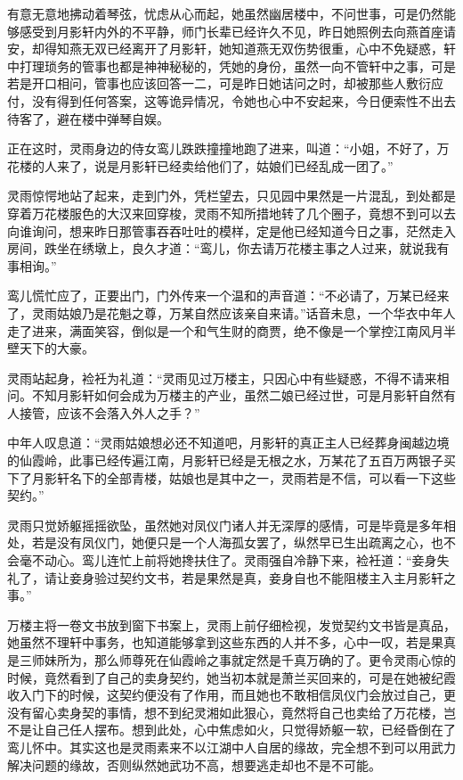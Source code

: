 有意无意地拂动着琴弦，忧虑从心而起，她虽然幽居楼中，不问世事，可是仍然能够感受到月影轩内外的不平静，师门长辈已经许久不见，昨日她照例去向燕首座请安，却得知燕无双已经离开了月影轩，她知道燕无双伤势很重，心中不免疑惑，轩中打理琐务的管事也都是神神秘秘的，凭她的身份，虽然一向不管轩中之事，可是若是开口相问，管事也应该回答一二，可是昨日她诘问之时，却被那些人敷衍应付，没有得到任何答案，这等诡异情况，令她也心中不安起来，今日便索性不出去待客了，避在楼中弹琴自娱。

正在这时，灵雨身边的侍女鸾儿跌跌撞撞地跑了进来，叫道：“小姐，不好了，万花楼的人来了，说是月影轩已经卖给他们了，姑娘们已经乱成一团了。”

灵雨惊愕地站了起来，走到门外，凭栏望去，只见园中果然是一片混乱，到处都是穿着万花楼服色的大汉来回穿梭，灵雨不知所措地转了几个圈子，竟想不到可以去向谁询问，想来昨日那管事吞吞吐吐的模样，定是他已经知道今日之事，茫然走入房间，跌坐在绣墩上，良久才道：“鸾儿，你去请万花楼主事之人过来，就说我有事相询。”

鸾儿慌忙应了，正要出门，门外传来一个温和的声音道：“不必请了，万某已经来了，灵雨姑娘乃是花魁之尊，万某自然应该亲自来请。”话音未息，一个华衣中年人走了进来，满面笑容，倒似是一个和气生财的商贾，绝不像是一个掌控江南风月半壁天下的大豪。

灵雨站起身，裣衽为礼道：“灵雨见过万楼主，只因心中有些疑惑，不得不请来相问。不知月影轩如何会成为万楼主的产业，虽然二娘已经过世，可是月影轩自然有人接管，应该不会落入外人之手？”

中年人叹息道：“灵雨姑娘想必还不知道吧，月影轩的真正主人已经葬身闽越边境的仙霞岭，此事已经传遍江南，月影轩已经是无根之水，万某花了五百万两银子买下了月影轩名下的全部青楼，姑娘也是其中之一，灵雨若是不信，可以看一下这些契约。”

灵雨只觉娇躯摇摇欲坠，虽然她对凤仪门诸人并无深厚的感情，可是毕竟是多年相处，若是没有凤仪门，她便只是一个人海孤女罢了，纵然早已生出疏离之心，也不会毫不动心。鸾儿连忙上前将她搀扶住了。灵雨强自冷静下来，裣衽道：“妾身失礼了，请让妾身验过契约文书，若是果然是真，妾身自也不能阻楼主入主月影轩之事。”

万楼主将一卷文书放到窗下书案上，灵雨上前仔细检视，发觉契约文书皆是真品，她虽然不理轩中事务，也知道能够拿到这些东西的人并不多，心中一叹，若是果真是三师妹所为，那么师尊死在仙霞岭之事就定然是千真万确的了。更令灵雨心惊的时候，竟然看到了自己的卖身契约，她当初本就是萧兰买回来的，可是在她被纪霞收入门下的时候，这契约便没有了作用，而且她也不敢相信凤仪门会放过自己，更没有留心卖身契的事情，想不到纪灵湘如此狠心，竟然将自己也卖给了万花楼，岂不是让自己任人摆布。想到此处，心中焦虑如火，只觉得娇躯一软，已经昏倒在了鸾儿怀中。其实这也是灵雨素来不以江湖中人自居的缘故，完全想不到可以用武力解决问题的缘故，否则纵然她武功不高，想要逃走却也不是不可能。

